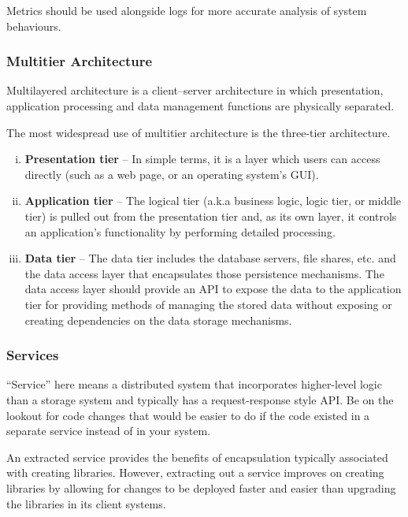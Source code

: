 \documentclass{article}
\begin{document}
    Metrics should be used alongside logs for more accurate analysis of system behaviours.

    \subsubsection{Multitier Architecture}
     Multilayered architecture is a client–server architecture in which presentation, application processing and data management functions are physically separated. 
    
    The most widespread use of multitier architecture is the three-tier architecture.

    \begin{enumerate}[i.]
        \item \textbf{Presentation tier} -- In simple terms, it is a layer which users can access directly (such as a web page, or an operating system's GUI).
        \item \textbf{Application tier} -- The logical tier (a.k.a business logic, logic tier, or middle tier) is pulled out from the presentation tier and, as its own layer, it controls an application’s functionality by performing detailed processing.
        \item \textbf{Data tier} -- The data tier includes the database servers, file shares, etc. and the data access layer that encapsulates those persistence mechanisms. The data access layer should provide an API to expose the data to the application tier for providing methods of managing the stored data without exposing or creating dependencies on the data storage mechanisms.
    \end{enumerate}
    
    \subsubsection{Services}
    ``Service” here means a distributed system that incorporates higher-level logic than a storage system and typically has a request-response style API. Be on the lookout for code changes that would be easier to do if the code existed in a separate service instead of in your system.
    
    An extracted service provides the benefits of encapsulation typically associated with creating libraries. However, extracting out a service improves on creating libraries by allowing for changes to be deployed faster and easier than upgrading the libraries in its client systems.
    
\end{document}
